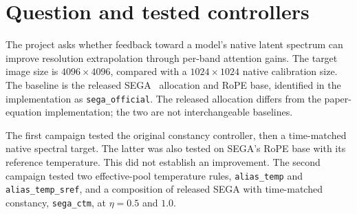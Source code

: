 \begin{abstract}
We test whether spectral feedback on rotary-position attention gains improves
training-free 4K generation with FLUX.1-Krea-dev. Constancy RoPE compares the
predicted clean latent spectrum with a native-resolution reference and applies
a bounded, noise-gated correction to spatial attention gains. Two completed
campaigns fail to demonstrate an improvement over the released SEGA baseline.
In the second campaign, only SEGA plus time-matched constancy at gain $\eta=1$
passes the eight-prompt development gate. On 187 held-out prompt pairs, its
ImageReward difference is $+0.00857$ with a 95\% confidence interval of
$[-0.00841,0.02742]$, while full-resolution MUSIQ changes by $-0.20860$
$[-0.70887,0.31512]$. PickScore and crop MUSIQ decrease.
These results do not support an efficacy or state-of-the-art claim.
This working report records the completed experiments; it is not a
submission-ready methods paper.
\end{abstract}

\section{Question and tested controllers}
The project asks whether feedback toward a model's native latent spectrum can
improve resolution extrapolation through per-band attention gains. The target
image size is $4096\times4096$, compared with a $1024\times1024$ native
calibration size. The baseline is the released SEGA~\citep{sega2026} allocation and RoPE base,
identified in the implementation as \texttt{sega\_official}. The released
allocation differs from the paper-equation implementation; the two are not
interchangeable baselines.

The first campaign tested the original constancy controller, then a time-matched
native spectral target. The latter was also tested on SEGA's RoPE base with its
reference temperature. This did not establish an improvement. The second
campaign tested two effective-pool temperature rules, \texttt{alias\_temp}
and \texttt{alias\_temp\_sref}, and a composition of released SEGA with
time-matched constancy, \texttt{sega\_ctm}, at $\eta=0.5$ and $1.0$.

